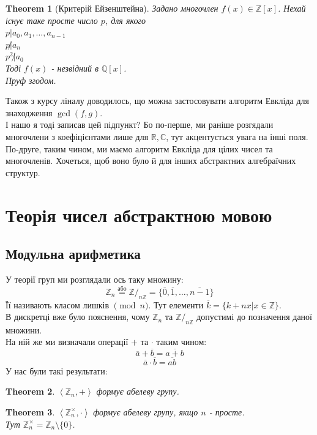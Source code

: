 \documentclass[a4paper, 10pt]{article}
\theoremstyle{theoremdd}
\newtheorem{theorem}{Theorem}[subsection]
\theoremstyle{theoremdd}
\theoremstyle{theoremdd}
\theoremstyle{theoremdd}
\theoremstyle{theoremdd}
\theoremstyle{theoremdd}
\theoremstyle{theoremdd}
\theoremstyle{theoremdd}
\begin{document}
\begin{theorem}[Критерій Ейзенштейна]
Задано многочлен $f(x) \in \mathbb{Z}[x]$. Нехай існує таке просте число $p$, для якого\\
$p | a_0,a_1,\dots,a_{n-1}$\\
$p \not| a_n$\\
$p^2 \not| a_0$\\
Тоді $f(x)$ - незвідний в $\mathbb{Q}[x]$.\\
\textit{Пруф згодом.}
\end{theorem}

Також з курсу ліналу доводилось, що можна застосовувати алгоритм Евкліда для знаходження $\gcd (f,g)$.
\bigskip \\
І нашо я тоді записав цей підпункт? Бо по-перше, ми раніше розгядали многочлени з коефіцієнтами лише для $\mathbb{R}, \mathbb{C}$, тут акцентується увага на інші поля.\\
По-друге, таким чином, ми маємо алгоритм Евкліда для цілих чисел та многочленів. Хочеться, щоб воно було й для інших абстрактних алгебраїчних структур.
\newpage

\section{Теорія чисел абстрактною мовою}
\subsection{Модульна арифметика}
У теорії груп ми розглядали ось таку множину:
$$ \mathbb{Z}_n \overset{\text{або}}{=} \mathbb{Z}/_{n \mathbb{Z}} = \{ \overline{0}, \overline{1}, \dots, \overline{n-1} \} $$
Її називають класом лишків $\pmod n$. Тут елементи $\overline{k} = \{k+nx | x \in \mathbb{Z}\}$.\\
В дискретці вже було пояснення, чому $\mathbb{Z}_n$ та $\mathbb{Z}/_{n \mathbb{Z}}$ допустимі до позначення даної множини.\\
На ній же ми визначали операції $+$ та $\cdot$ таким чином:\\
$$ \overline{a} + \overline{b} = \overline{a + b}$$
$$ \overline{a} \cdot \overline{b} = \overline{ab}$$
У нас були такі результати:
\begin{theorem}
$\left< \mathbb{Z}_n, + \right>$ формує абелеву групу.
\end{theorem}

\begin{theorem}
$\left< \mathbb{Z}_n^{\times}, \cdot \right>$ формує абелеву групу, якщо $n$ - просте. \\
Тут $\mathbb{Z}_n^{\times} = \mathbb{Z}_n \setminus \{0\}$.
\end{theorem}
\end{document}
